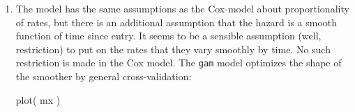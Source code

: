 \begin{enumerate}[resume]
\item The model has the same assumptions as the Cox-model about
  proportionality of rates, but there is an additional assumption that
  the hazard is a smooth function of time since entry. It seems to be
  a sensible assumption (well, restriction) to put on the rates that
  they vary smoothly by time. No such restriction is made in the Cox
  model. The \texttt{gam} model optimizes the shape of the smoother by
  general cross-validation:
\begin{Schunk}
\begin{Sinput}
 plot( mx )
\end{Sinput}
\end{Schunk}



\end{enumerate}
